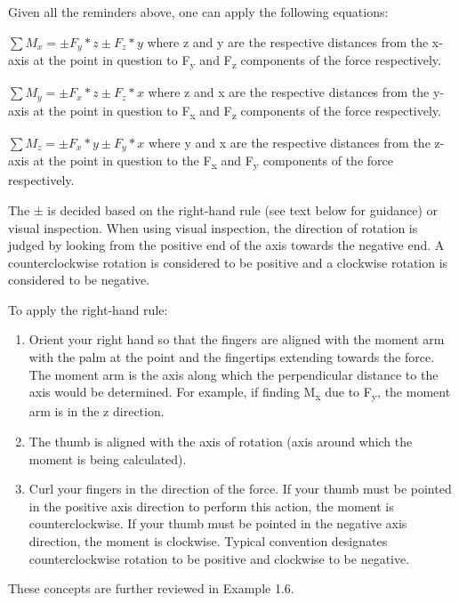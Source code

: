 \documentclass[
  letterpaper,
  DIV=11,
  numbers=noendperiod]{scrreprt}
\begin{document}
Given all the reminders above, one can apply the following equations:

\(\sum M_x= \pm F_y * z \pm F_z * y\) where z and y are the respective
distances from the x-axis at the point in question to F\textsubscript{y}
and F\textsubscript{z} components of the force respectively.

\(\sum M_y= \pm F_x * z \pm F_z * x\) where z and x are the respective
distances from the y-axis at the point in question to F\textsubscript{x}
and F\textsubscript{z} components of the force respectively.

\(\sum M_z= \pm F_x * y \pm F_y * x\) where y and x are the respective
distances from the z-axis at the point in question to the
F\textsubscript{x} and F\textsubscript{y} components of the force
respectively.

The ± is decided based on the right-hand rule (see text below for
guidance) or visual inspection. When using visual inspection, the
direction of rotation is judged by looking from the positive end of the
axis towards the negative end. A counterclockwise rotation is considered
to be positive and a clockwise rotation is considered to be negative.

To apply the right-hand rule:

\begin{enumerate}
\def\labelenumi{\arabic{enumi}.}
\item
  Orient your right hand so that the fingers are aligned with the moment
  arm with the palm at the point and the fingertips extending towards
  the force. The moment arm is the axis along which the perpendicular
  distance to the axis would be determined. For example, if finding
  M\textsubscript{x} due to F\textsubscript{y}, the moment arm is in the
  z direction.
\item
  The thumb is aligned with the axis of rotation (axis around which the
  moment is being calculated).
\item
  Curl your fingers in the direction of the force. If your thumb must be
  pointed in the positive axis direction to perform this action, the
  moment is counterclockwise. If your thumb must be pointed in the
  negative axis direction, the moment is clockwise. Typical convention
  designates counterclockwise rotation to be positive and clockwise to
  be negative.
\end{enumerate}

These concepts are further reviewed in Example 1.6.
\end{document}
